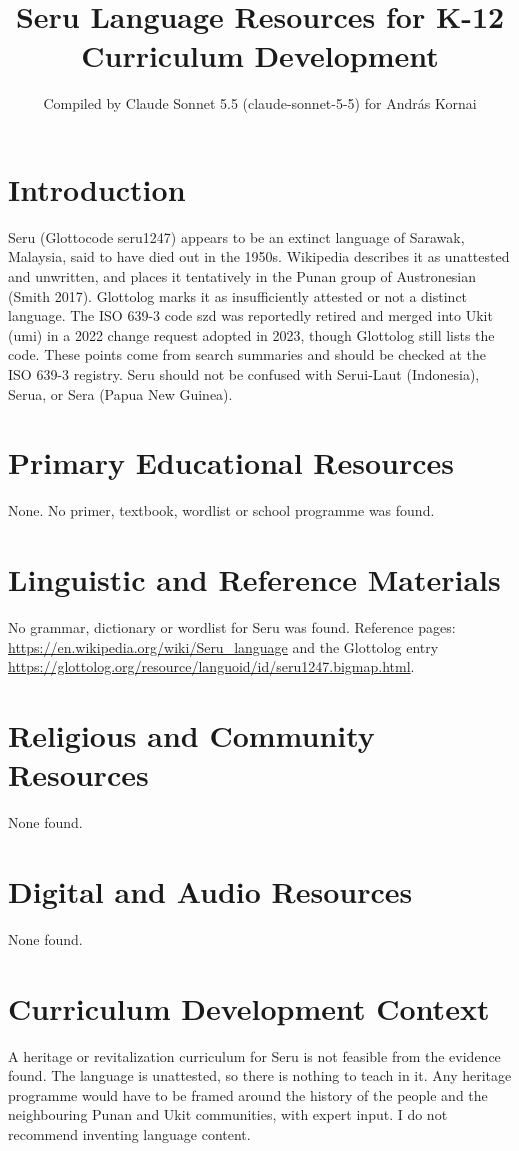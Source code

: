 \documentclass[12pt]{article}
\title{Seru Language Resources for K-12 Curriculum Development}
\author{Compiled by Claude Sonnet 5.5 (claude-sonnet-5-5) for Andr\'as Kornai}
\date{}
\begin{document}
\maketitle

\section{Introduction}
Seru (Glottocode seru1247) appears to be an extinct language of Sarawak, Malaysia, said to have died out in the 1950s. Wikipedia describes it as unattested and unwritten, and places it tentatively in the Punan group of Austronesian (Smith 2017). Glottolog marks it as insufficiently attested or not a distinct language. The ISO 639-3 code szd was reportedly retired and merged into Ukit (umi) in a 2022 change request adopted in 2023, though Glottolog still lists the code. These points come from search summaries and should be checked at the ISO 639-3 registry. Seru should not be confused with Serui-Laut (Indonesia), Serua, or Sera (Papua New Guinea).

\section{Primary Educational Resources}
None. No primer, textbook, wordlist or school programme was found.

\section{Linguistic and Reference Materials}
No grammar, dictionary or wordlist for Seru was found. Reference pages: \url{https://en.wikipedia.org/wiki/Seru_language} and the Glottolog entry \url{https://glottolog.org/resource/languoid/id/seru1247.bigmap.html}.

\section{Religious and Community Resources}
None found.

\section{Digital and Audio Resources}
None found.

\section{Curriculum Development Context}
A heritage or revitalization curriculum for Seru is not feasible from the evidence found. The language is unattested, so there is nothing to teach in it. Any heritage programme would have to be framed around the history of the people and the neighbouring Punan and Ukit communities, with expert input. I do not recommend inventing language content.
\end{document}
